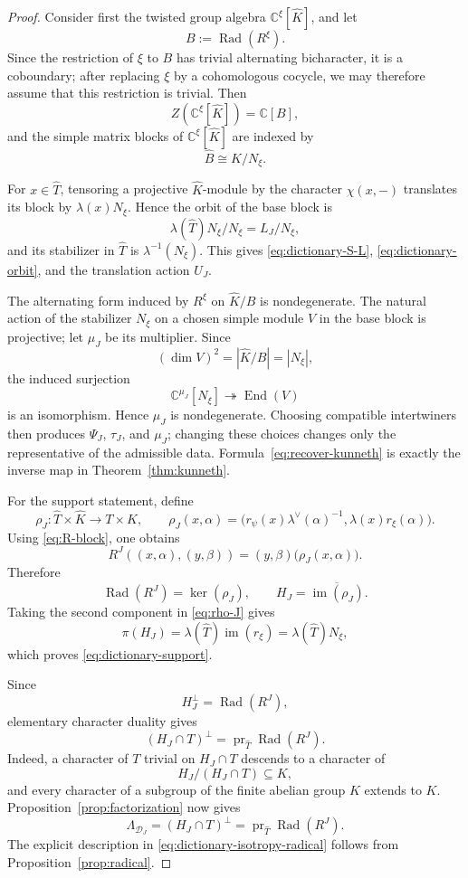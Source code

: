 \documentclass{amsart}
\theoremstyle{definition}
\newcommand{\End}{\operatorname{End}}
\newcommand{\Rad}{\operatorname{Rad}}
\numberwithin{equation}{section}
\begin{document}
\begin{proof}
Consider first the twisted group algebra $\mathbb C^\xi[\widehat K]$, and let
\[
 B:=\Rad(R^\xi).
\]
Since the restriction of $\xi$ to $B$ has trivial alternating bicharacter,
it is a coboundary; after replacing $\xi$ by a cohomologous cocycle, we may
therefore assume that this restriction is trivial.  Then
\[
 Z(\mathbb C^\xi[\widehat K])=\mathbb C[B],
\]
and the simple matrix blocks of $\mathbb C^\xi[\widehat K]$ are indexed by
\[
 \widehat{B}\cong K/N_\xi.
\]

For $x\in \widehat T$, tensoring a projective $\widehat K$-module by the character
$\chi(x,-)$ translates its block by $\lambda(x)N_\xi$.  Hence the orbit of
the base block is
\[
 \lambda(\widehat T)N_\xi/N_\xi=L_J/N_\xi,
\]
and its stabilizer in $\widehat T$ is $\lambda^{-1}(N_\xi)$.  This gives
\eqref{eq:dictionary-S-L}, \eqref{eq:dictionary-orbit}, and the translation
action $U_J$.

The alternating form induced by $R^\xi$ on $\widehat K/B$ is nondegenerate.  The
natural action of the stabilizer $N_\xi$ on a chosen simple module $V$ in
the base block is projective; let $\mu_J$ be its multiplier.  Since
\[
 (\dim V)^2=|\widehat K/B|=|N_\xi|,
\]
the induced surjection
\[
 \mathbb C^{\mu_J}[N_\xi]\twoheadrightarrow\End(V)
\]
is an isomorphism.  Hence $\mu_J$ is nondegenerate.  Choosing compatible
intertwiners then produces $\Psi_J$, $\tau_J$, and $\mu_J$; changing these
choices changes only the representative of the admissible data.
Formula~\eqref{eq:recover-kunneth} is exactly the inverse map in
Theorem~\ref{thm:kunneth}.

For the support statement, define
\begin{equation}\label{eq:rho-J}
 \rho_J:\widehat T\times \widehat K\longrightarrow T\times K,
 \qquad
 \rho_J(x,\alpha)
 =
 \bigl(
 r_\psi(x)\lambda^\vee(\alpha)^{-1},
 \lambda(x)r_\xi(\alpha)
 \bigr).
\end{equation}
Using \eqref{eq:R-block}, one obtains
\[
 R^J((x,\alpha),(y,\beta))
 =(y,\beta)\bigl(\rho_J(x,\alpha)\bigr).
\]
Therefore
\[
 \Rad(R^J)=\ker(\rho_J),
 \qquad
 H_J=\overline{\operatorname{im}(\rho_J)}.
\]
Taking the second component in \eqref{eq:rho-J} gives
\[
 \pi(H_J)
 =
 \lambda(\widehat T)\operatorname{im}(r_\xi)
 =
 \lambda(\widehat T)N_\xi,
\]
which proves \eqref{eq:dictionary-support}.

Since
\[
 H_J^\perp=\Rad(R^J),
\]
elementary character duality gives
\[
 (H_J\cap T)^\perp=\operatorname{pr}_{\widehat T}\Rad(R^J).
\]
Indeed, a character of $T$ trivial on $H_J\cap T$ descends to a character of
\[
 H_J/(H_J\cap T)\subseteq K,
\]
and every character of a subgroup of the finite abelian group $K$ extends
to $K$.  Proposition~\ref{prop:factorization} now gives
\[
 \Lambda_{\mathcal D_J}
 =(H_J\cap T)^\perp
 =\operatorname{pr}_{\widehat T}\Rad(R^J).
\]
The explicit description in
\eqref{eq:dictionary-isotropy-radical} follows from
Proposition~\ref{prop:radical}.
\end{proof}
\end{document}
